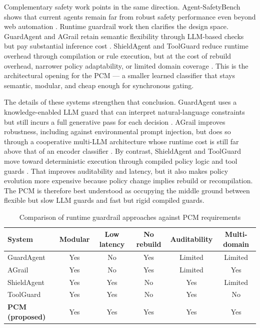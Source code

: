 \documentclass[12pt,a4paper]{article}
\begin{document}
Complementary safety work points in the same direction. Agent-SafetyBench shows
that current agents remain far from robust safety performance even beyond web
automation \citep{zhang2024agentsafety}. Runtime guardrail work then clarifies
the design space. GuardAgent and AGrail retain semantic flexibility through
LLM-based checks but pay substantial inference cost
\citep{xiang2024guardagent,luo2025agrail}. ShieldAgent and ToolGuard reduce
runtime overhead through compilation or rule execution, but at the cost of
rebuild overhead, narrower policy adaptability, or limited domain coverage
\citep{chen2025shieldagent,zwerdling2025toolguard}. This is the architectural
opening for the PCM --- a smaller learned classifier that stays semantic,
modular, and cheap enough for synchronous gating.

The details of these systems strengthen that conclusion. GuardAgent uses a
knowledge-enabled LLM guard that can interpret natural-language constraints but
still incurs a full generative pass for each decision \citep{xiang2024guardagent}.
AGrail improves robustness, including against environmental prompt injection,
but does so through a cooperative multi-LLM architecture whose runtime cost is
still far above that of an encoder classifier \citep{luo2025agrail}. By
contrast, ShieldAgent and ToolGuard move toward deterministic execution through
compiled policy logic and tool guards \citep{chen2025shieldagent,zwerdling2025toolguard}.
That improves auditability and latency, but it also makes policy evolution more
expensive because policy change implies rebuild or recompilation. The PCM is
therefore best understood as occupying the middle ground between flexible but
slow LLM guards and fast but rigid compiled guards.

\begin{table}[htbp]
\centering\small
\caption{Comparison of runtime guardrail approaches against PCM requirements}
\label{tab:guardrail_comparison}
\begin{tabular}{@{} l c c c c c @{}}
\toprule
\textbf{System} & \textbf{Modular} & \textbf{Low latency} & \textbf{No rebuild} & \textbf{Auditability} & \textbf{Multi-domain} \\
\midrule
GuardAgent \citep{xiang2024guardagent}   & Yes & No  & Yes & Limited & Limited \\
AGrail \citep{luo2025agrail}             & Yes & No  & Yes & Limited & Yes \\
ShieldAgent \citep{chen2025shieldagent}  & Yes & Yes & No  & Yes     & Limited \\
ToolGuard \citep{zwerdling2025toolguard} & Yes & Yes & No  & Yes     & No \\
\midrule
\textbf{PCM (proposed)} & Yes & Yes & Yes & Yes & Yes \\
\bottomrule
\end{tabular}
\end{table}
\end{document}
